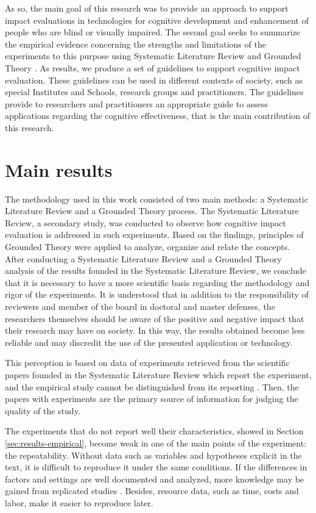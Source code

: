 As so, the main goal of this research was to provide an approach to support impact evaluations in technologies for cognitive development and enhancement of people who are blind or visually impaired. The second goal seeks to summarize the empirical evidence concerning the strengths and limitations of the experiments to this purpose using Systematic Literature Review and Grounded Theory \cite{Kitchenham2007}. As results, we produce a set of guidelines to support cognitive impact evaluation. These guidelines can be used in different contexts of society, such as special Institutes and Schools, research groups and practitioners. The guidelines provide to researchers and practitioners an appropriate guide to assess applications regarding the cognitive effectiveness, that is the main contribution of this research.

\section{Main results}
\label{sec:conclusion-mainresults}
The methodology used in this work consisted of two main methods: a Systematic Literature Review and a Grounded Theory process. The Systematic Literature Review, a secondary study, was conducted to observe how cognitive impact evaluation is addressed in such experiments. Based on the findings, principles of Grounded Theory were applied to analyze, organize and relate the concepts. After conducting a Systematic Literature Review and a Grounded Theory analysis of the results founded in the Systematic Literature Review, we conclude that it is necessary to have a more scientific basis regarding the methodology and rigor of the experiments. {It is understood that in addition to the responsibility of reviewers and member of the board in doctoral and master defenses, the researchers themselves should be aware of the positive and negative impact that their research may have on society.} In this way, the results obtained become less reliable and may discredit the use of the presented application or technology. 

This perception is based on data of experiments retrieved from the scientific papers founded in the Systematic Literature Review which report the experiment, and the empirical study cannot be distinguished from its reporting \cite{Wohlin2000}. Then, the papers with experiments are the primary source of information for judging the quality of the study.

The experiments that do not report well their characteristics, showed in Section \ref{sec:results-empirical}, become weak in one of the main points of the experiment: the repeatability. Without data such as variables and hypotheses explicit in the text, it is difficult to reproduce it under the same conditions. If the differences in factors and settings are well documented and analyzed, more knowledge may be gained from replicated studies \cite{Wohlin2000}. Besides, resource data, such as time, costs and labor, make it easier to reproduce later.

